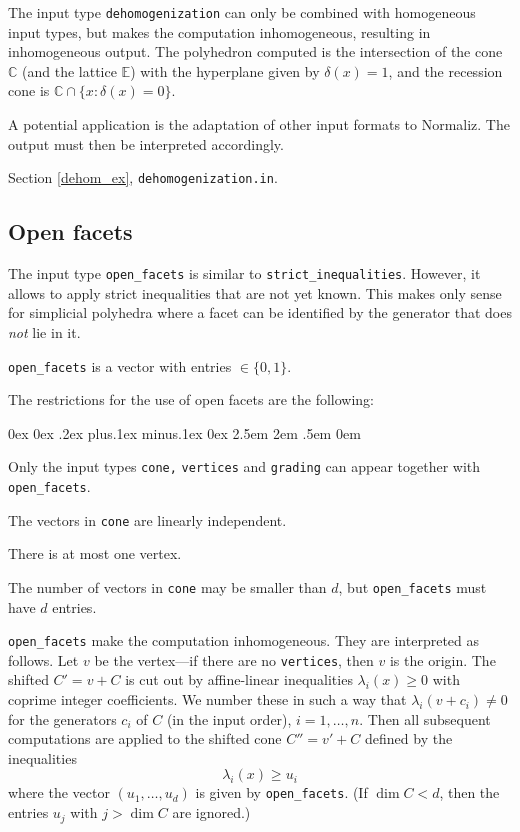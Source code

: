 \documentclass[12pt,a4paper]{scrartcl}
\newcounter{listi}
\newcommand{\stdli}{ \topsep0ex \partopsep0ex %
\parsep.2ex plus.1ex minus.1ex \itemsep0ex%
\leftmargin2.5em \labelwidth2em \labelsep.5em \rightmargin0em}%
\newenvironment{arab}{\begin{list}{\textup{(\arabic{listi})}}%
	{\usecounter{listi}\stdli}}{\end{list}}
\theoremstyle{definition}
\def\CC{{\mathbb C}}
\def\EE{{\mathbb E}}
\begin{document}
The input type \verb|dehomogenization| can only be combined with homogeneous input types, but makes the computation inhomogeneous, resulting in inhomogeneous output. The polyhedron computed is the intersection of the cone $\CC$ (and the lattice $\EE$) with the hyperplane given by $\delta(x)=1$, and the recession cone is $\CC\cap\{x:\delta(x)=0\}$.

A potential application is the adaptation of other input formats to Normaliz. The output must then be interpreted accordingly.

Section \ref{dehom_ex}, \verb|dehomogenization.in|.

\subsection{Open facets}\label{open_facets}

The input type \verb|open_facets| is similar to \verb|strict_inequalities|. However, it allows to apply strict inequalities that are not yet known. This makes only sense for simplicial polyhedra where a facet can be identified by the generator that does \emph{not} lie in it.

\verb|open_facets| is a vector with entries $\in \{0,1\}$.

The restrictions for the use of open facets are the following:
\begin{arab}
	\item Only the input types \verb|cone,| \verb|vertices| and \verb|grading| can appear together with \verb|open_facets|.
	\item The vectors in \verb|cone| are linearly independent.
	\item There is at most one vertex.
\end{arab}
The number of vectors in \verb|cone| may be smaller than $d$, but \verb|open_facets| must have $d$ entries.


\verb|open_facets| make the computation inhomogeneous. They are interpreted as follows. Let $v$ be the vertex---if there are no \verb|vertices|, then $v$ is the origin. The shifted $C'=v+C$ is cut out by affine-linear inequalities $\lambda_i(x)\ge 0$ with coprime integer coefficients. We number these in such a way that $\lambda_i(v+c_i)\neq 0$ for the generators $c_i$ of $C$ (in the input order), $i=1,\dots,n$. Then all subsequent computations are applied to the shifted cone $C''=v'+C$ defined by the inequalities
$$
\lambda_i(x)\ge u_i
$$
where the vector $(u_1,\dots,u_d)$ is given by \verb|open_facets|. (If $\dim C<d$, then the entries $u_j$ with $j> \dim C$ are ignored.) 
\end{document}
